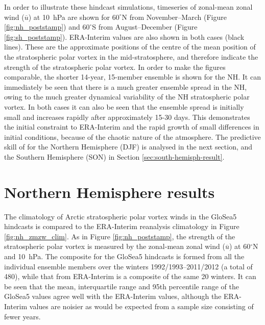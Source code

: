 In order to illustrate these hindcast simulations, timeseries of zonal-mean
zonal wind ($\overline{u}$) at 10~hPa are shown for $60^{\circ}$N from
November--March (Figure \ref{fig:nh_poststamp}) and $60^{\circ}$S from
August--December (Figure \ref{fig:sh_poststamp}). ERA-Interim values are also
shown in both cases (black lines). These are the approximate positions of the
centre of the mean position of the stratospheric polar vortex in the
mid-stratosphere, and therefore indicate the strength of the stratospheric polar
vortex. In order to make the figures comparable, the shorter 14-year, 15-member
ensemble is shown for the NH. It can immediately be seen that there is a much
greater ensemble spread in the NH, owing to the much greater dynamical
variability of the NH stratospheric polar vortex. In both cases it can also be
seen that the ensemble spread is initially small and increases rapidly after
approximately 15-30 days. This demonstrates the initial constraint to
ERA-Interim and the rapid growth of small differences in initial conditions,
because of the chaotic nature of the atmosphere. The predictive skill of for the
Northern Hemisphere (DJF) is analysed in the next section, and the Southern
Hemisphere (SON) in Section \ref{sec:south-hemisph-result}.


\section{Northern Hemisphere results}
\label{sec:north-hemisph-result}

The climatology of Arctic stratospheric polar vortex winds in the GloSea5
hindcasts is compared to the ERA-Interim reanalysis climatology in Figure
\ref{fig:nh_zmzw_clim}. As in Figure \ref{fig:nh_poststamp}, the strength of the
stratospheric polar vortex is measured by the zonal-mean zonal wind
($\overline{u}$) at 60$^{\circ}$N and 10~hPa. The composite for the GloSea5
hindcasts is formed from all the individual ensemble members over the winters
1992/1993--2011/2012 (a total of 480), while that from ERA-Interim is a
composite of the same 20 winters. It can be seen that the mean, interquartile
range and 95th percentile range of the GloSea5 values agree well with the
ERA-Interim values, although the ERA-Interim values are noisier as would be
expected from a sample size consisting of fewer years.

